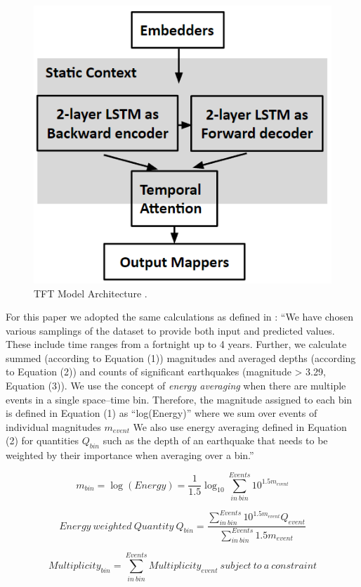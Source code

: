 \documentclass[utf8]{FrontiersinVancouver} %
\begin{document}
\begin{figure}[htb]
    \centering\includegraphics[width=0.5\columnwidth]{images/TFT}
    \caption{TFT Model Architecture \citep{fox2022-jm}.}
    \label{fig:TFT_Model_Arch}
\end{figure}


For this paper we adopted the same calculations as defined in \cite{fox2022-jm}: ``We have chosen various samplings of the dataset to provide both input and predicted values. These include time ranges from a fortnight up to 4 years. Further, we calculate summed (according to Equation (1)) magnitudes and averaged depths (according to Equation (2)) and counts of significant earthquakes (magnitude > 3.29, Equation (3)).  We use the concept of {\em energy averaging} when there are multiple events in a single space–time bin. Therefore, the magnitude assigned to each bin is defined in Equation (1) as “log(Energy)” where we sum over events of individual magnitudes $m_{event}$  We also use energy averaging defined in Equation (2) for quantities $Q_{bin}$ such as the depth of an earthquake that needs to be weighted by their importance when averaging over a bin.''

\begin{equation}
m_{bin} = \log(Energy) = \frac{1}{1.5}\log_{10}\sum_{in~bin}^{Events}10^{1.5m_{event}}
\end{equation}

\begin{equation}
Energy~weighted~Quantity~Q_{bin} = \frac{\displaystyle
   \sum^{Events}_{in~bin} 10^{1.5m_{event}} Q_{event}}{\displaystyle \sum^{Events}_{in~bin}1.5m_{event}}
\end{equation}

\begin{equation}
Multiplicity_{bin} = \sum^{Events}_{in~bin}Multiplicity_{event} ~ subject~to~a~constraint
\end{equation}
\end{document}
